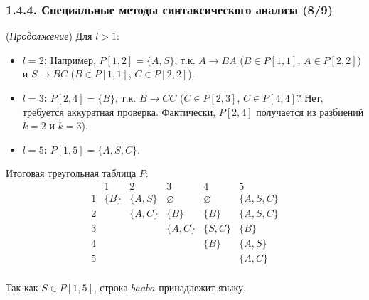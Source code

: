\begin{frame}
\frametitle{1.4.4. Специальные методы синтаксического анализа (8/9)}
\begin{example} (\textit{Продолжение})
Для $l > 1$:
\begin{itemize}
    \item \textbf{$l=2$:} Например, $P[1,2] = \{A, S\}$, т.к. $A \to BA$ ($B \in P[1,1]$, $A \in P[2,2]$) и $S \to BC$ ($B \in P[1,1]$, $C \in P[2,2]$).
    \item \textbf{$l=3$:} $P[2,4] = \{B\}$, т.к. $B \to CC$ ($C \in P[2,3]$, $C \in P[4,4]$? Нет, требуется аккуратная проверка. Фактически, $P[2,4]$ получается из разбиений $k=2$ и $k=3$).
    \item \textbf{$l=5$:} $P[1,5] = \{A, S, C\}$.
\end{itemize}

\vspace{2mm}
Итоговая треугольная таблица $P$:
\[
\begin{array}{c|ccccc}
  & 1 & 2 & 3 & 4 & 5\\
\hline
1 & \{B\} & \{A,S\} & \varnothing & \varnothing & \{A,S,C\}\\
2 &       & \{A,C\} & \{B\} & \{B\} & \{A,S,C\}\\
3 &       &         & \{A,C\} & \{S,C\} & \{B\}\\
4 &       &         &         & \{B\} & \{A,S\}\\
5 &       &         &         &         & \{A,C\}\\
\end{array}
\]

Так как $S \in P[1,5]$, строка $baaba$ принадлежит языку.
\end{example}
\end{frame}

